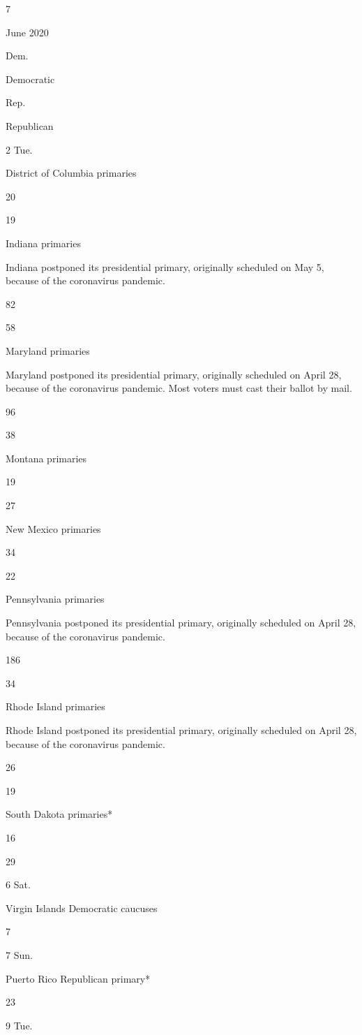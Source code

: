 7

June 2020

Dem.

Democratic

Rep.

Republican

2 Tue.

District of Columbia primaries

20

19

Indiana primaries

Indiana postponed its presidential primary, originally scheduled on May
5, because of the coronavirus pandemic.

82

58

Maryland primaries

Maryland postponed its presidential primary, originally scheduled on
April 28, because of the coronavirus pandemic. Most voters must cast
their ballot by mail.

96

38

Montana primaries

19

27

New Mexico primaries

34

22

Pennsylvania primaries

Pennsylvania postponed its presidential primary, originally scheduled on
April 28, because of the coronavirus pandemic.

186

34

Rhode Island primaries

Rhode Island postponed its presidential primary, originally scheduled on
April 28, because of the coronavirus pandemic.

26

19

South Dakota primaries*

16

29

6 Sat.

Virgin Islands Democratic caucuses

7

7 Sun.

Puerto Rico Republican primary*

23

9 Tue.

